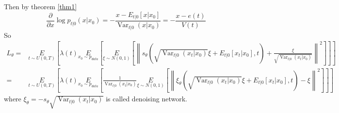 \documentclass{ctexart}
\begin{document}
Then by theorem \ref{thm1}
\begin{equation}
    \frac{\partial}{\partial x} \log p_{t | 0}\left(x | x_{0}\right)=-\frac{x-E_{t | 0}\left[x | x_{0}\right]}{\operatorname{Var}_{t | 0}\left(x | x_{0}\right)}=-\frac{x-e(t)}{V(t)}
\end{equation}
So
\begin{equation}
\begin{aligned}
    L_\theta=&\underset{t\sim U(0,T)}{E}\left[\lambda (t)\underset{x_0\sim p_{data}}{E}\left[\underset{\xi\sim N(0, 1)}{E}\left[\left\|s_\theta\left(\sqrt{\operatorname{Var}_{t|0}(x_t|x_0)}\xi+E_{t|0}[x_t|x_0], t\right) + \frac{\xi}{\sqrt{\operatorname{Var}_{t|0}(x_t|x_0)}}\right\|^2\right]\right]\right]\\
    =&\underset{t\sim U(0,T)}{E}\left[\lambda (t)\underset{x_0\sim p_{data}}{E}\left[\frac{1}{\operatorname{Var}_{t|0}(x_t|x_0)}\underset{\xi\sim N(0, 1)}{E}\left[\left\|\xi_\theta\left(\sqrt{\operatorname{Var}_{t|0}(x_t|x_0)}\xi+E_{t|0}[x_t|x_0], t\right)-\xi\right\|^2\right]\right]\right]
\end{aligned}    
\end{equation}
where $\xi_\theta = -s_\theta\sqrt{\operatorname{Var}_{t|0}(x_t|x_0)}$ is called denoising network.
\end{document}
